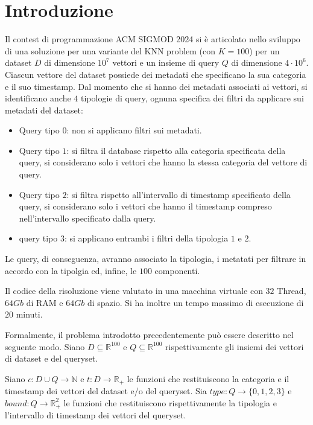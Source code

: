 \chapter{Introduzione}

Il contest di programmazione ACM SIGMOD 2024 si è articolato nello sviluppo di una soluzione 
per una variante del KNN problem (con $K=100$) per un dataset $D$ di dimensione 
$10^7$ vettori e un insieme di query $Q$ di dimensione $4\cdot 10^6$. Ciascun 
vettore del dataset possiede dei metadati che specificano la sua categoria e il
suo timestamp. Dal momento che si hanno dei metadati associati ai vettori, si 
identificano anche $4$ tipologie di query, ognuna specifica dei filtri da applicare sui 
metadati del dataset:
\begin{itemize}
    \item Query tipo $0$: non si applicano filtri sui metadati.
    \item Query tipo $1$: si filtra il database rispetto alla categoria specificata della query, si considerano 
    solo i vettori che hanno la stessa categoria del vettore di query.
    \item Query tipo $2$: si filtra rispetto all'intervallo di timestamp specificato della query,
    si considerano solo i vettori che hanno il timestamp compreso nell'intervallo 
    specificato dalla query.
    \item query tipo $3$: si applicano entrambi i filtri della tipologia $1$ e $2$.
\end{itemize}

Le query, di conseguenza, avranno associato la tipologia, i metatati per filtrare 
in accordo con la tipolgia ed, infine, le $100$ componenti.

Il codice della risoluzione viene valutato in una macchina virtuale con $32$ Thread,
$64Gb$ di RAM e $64Gb$ di spazio. Si ha inoltre un tempo massimo di esecuzione 
di $20$ minuti.

Formalmente, il problema introdotto precedentemente può essere descritto nel 
seguente modo. Siano $D\subseteq \mathbb{R}^{100}$ e $Q\subseteq \mathbb{R}^{100}$
rispettivamente gli insiemi dei vettori di dataset e del queryset.

Siano $c:D\cup Q\to \mathbb{N}$ e $t:D\to \mathbb{R}_+$ le funzioni che restituiscono 
la categoria e il timestamp dei vettori del dataset e/o del queryset.
Sia $type: Q\to \{0, 1, 2, 3\}$ e $bound:Q \to \mathbb{R}^2_+$ le funzioni
che restituiscono rispettivamente la tipologia e l'intervallo di timestamp dei 
vettori del queryset.

